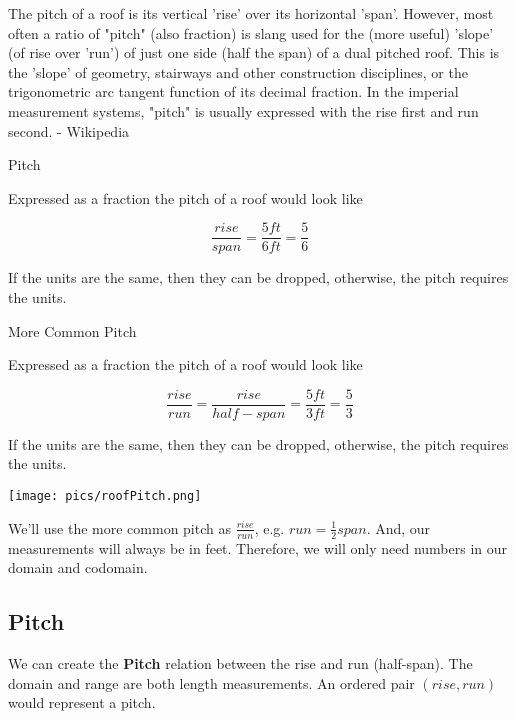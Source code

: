 \documentclass{ximera}
\author{Alan Yang}
\begin{document}
The pitch of a roof is its vertical 'rise' over its horizontal 'span'. However, most often a ratio of "pitch" (also fraction) is slang used for the (more useful) 'slope' (of rise over 'run') of just one side (half the span) of a dual pitched roof. This is the 'slope' of geometry, stairways and other construction disciplines, or the trigonometric arc tangent function of its decimal fraction. In the imperial measurement systems, "pitch" is usually expressed with the rise first and run second. - Wikipedia


\begin{example} Pitch


Expressed as a fraction the pitch of a roof would look like

\[
\frac{rise}{span} = \frac{5 ft}{6 ft} = \frac{5}{6}
\]

If the units are the same, then they can be dropped, otherwise, the pitch requires the units.
\end{example}






\begin{example} More Common Pitch


Expressed as a fraction the pitch of a roof would look like

\[
\frac{rise}{run} = \frac{rise}{half-span} = \frac{5 ft}{3 ft} = \frac{5}{3}
\]

If the units are the same, then they can be dropped, otherwise, the pitch requires the units.
\end{example}






\begin{image}
\texttt{[image: pics/roofPitch.png]}
\end{image}


We'll use the more common pitch as $\frac{rise}{run}$, e.g. $run = \frac{1}{2} span$. And, our measurements will always be in feet.  Therefore, we will only need numbers in our domain and codomain.



\subsection{Pitch}
We can create the \textbf{Pitch} relation between the rise and run (half-span).  The domain and range are both length measurements.  An ordered pair $(rise, run)$ would represent a pitch.
\end{document}
